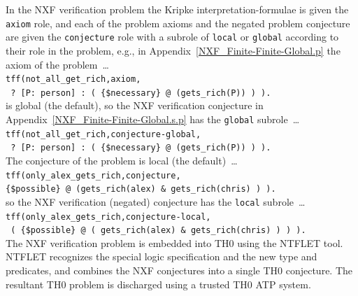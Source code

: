 \documentclass{easychair}
\newcommand{\smalltt}[1]{\small \texttt{#1}}
\begin{document}
In the NXF verification problem the Kripke interpretation-formulae is given the {\tt axiom} role,
and each of the problem axioms and the negated problem conjecture are given the {\tt conjecture} 
role with a subrole of {\tt local} or {\tt global} according to their role in the problem, e.g., 
in Appendix~\ref{NXF_Finite-Finite-Global.p} the axiom of the problem~\ldots \\
\hspace*{0.5cm}\smalltt{tff(not\_all\_get\_rich,axiom,} \\
\hspace*{0.8cm}\smalltt{{\raisebox{0.4ex}{\texttildelow}} ? [P: person] : ( \{\$necessary\} @ (gets\_rich(P)) ) ).}\\
is global (the default), so the NXF verification conjecture in 
Appendix~\ref{NXF_Finite-Finite-Global.s.p} has the {\tt global} subrole~\ldots \\
\hspace*{0.5cm}\smalltt{tff(not\_all\_get\_rich,conjecture-global,} \\
\hspace*{0.8cm}\smalltt{{\raisebox{0.4ex}{\texttildelow}} ? [P: person] : ( \{\$necessary\} @ (gets\_rich(P)) ) ).} \\
The conjecture of the problem is local (the default)~\ldots \\
\hspace*{0.5cm}\smalltt{tff(only\_alex\_gets\_rich,conjecture,} \\
\hspace*{0.8cm}\smalltt{\{\$possible\} @ (gets\_rich(alex) \& {\raisebox{0.4ex}{\texttildelow}} gets\_rich(chris) ) ).} \\
so the NXF verification (negated) conjecture has the {\tt local} subrole~\ldots \\
\hspace*{0.5cm}\smalltt{tff(only\_alex\_gets\_rich,conjecture-local,} \\
\hspace*{0.8cm}\smalltt{{\raisebox{0.4ex}{\texttildelow}} ( \{\$possible\} @ ( gets\_rich(alex) \& {\raisebox{0.4ex}{\texttildelow}} gets\_rich(chris) ) ) ).} \\

The NXF verification problem is embedded into TH0 using the NTFLET tool.
NTFLET recognizes the special logic specification and the new type and predicates, and combines
the NXF conjectures into a single TH0 conjecture.
The resultant TH0 problem is discharged using a trusted TH0 ATP system.
\end{document}

